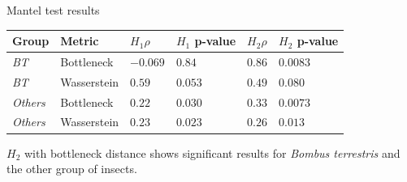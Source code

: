 \documentclass[10pt]{beamer}
\begin{document}
\begin{frame}[fragile]{Mantel test results}
\begin{table}[ht]
  \centering
\begin{tabular}{*6l}    \toprule
Group  & Metric  & $H_{1} \rho $  & $H_{1}$ p-value  & $H_{2} \rho$ & $H_{2}$ p-value  \\ \midrule
\textit{BT} & Bottleneck & $-0.069$ & $0.84$ & $0.86$ & $0.0083$\\
\textit{BT} & Wasserstein & $0.59 $ & $0.053 $ & $0.49$ & $0.080$\\
\textit{Others}& Bottleneck & $0.22$ & $0.030$ & $0.33$ & $0.0073$\\
\textit{Others}& Wasserstein & $0.23$ & $0.023$ & $0.26$ & $0.013$\\\bottomrule
 \hline
\end{tabular}
\end{table}
$H_{2}$ with bottleneck distance shows significant results for \textit{Bombus terrestris} and the other group of insects.
\end{frame}
\end{document}
